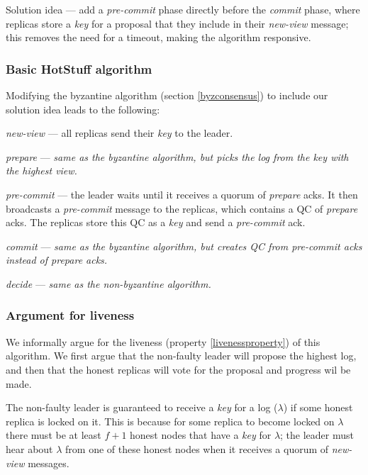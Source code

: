 Solution idea --- add a \textit{pre-commit} phase directly before the \textit{commit} phase, where replicas store a \textit{key} for a proposal that they include in their \textit{new-view} message; this removes the need for a timeout, making the algorithm responsive.

\subsubsection{Basic HotStuff algorithm}

Modifying the byzantine algorithm (section \ref{byzconsensus}) to include our solution idea leads to the following:

\begin{description}
	\item \textit{new-view} --- all replicas send their \textit{key} to the leader.
	\item \textit{prepare} ---  \textit{same as the byzantine algorithm, but picks the log from the key with the highest view.}
	\item \textit{pre-commit} --- the leader waits until it receives a quorum of \textit{prepare} acks. It then broadcasts a \textit{pre-commit} message to the replicas, which contains a QC of \textit{prepare} acks. The replicas store this QC as a \textit{key} and send a \textit{pre-commit} ack.
	\item \textit{commit} --- \textit{same as the byzantine algorithm, but creates QC from pre-commit acks instead of prepare acks.}
	\item \textit{decide} --- \textit{same as the non-byzantine algorithm.}
\end{description}

\subsubsection{Argument for liveness}
We informally argue for the liveness (property \ref{livenessproperty}) of this algorithm. We first argue that the non-faulty leader will propose the highest log, and then that the honest replicas will vote for the proposal and progress wil be made.

The non-faulty leader is guaranteed to receive a \textit{key} for a log ($\lambda$) if some honest replica is locked on it. This is because for some replica to become locked on $\lambda$ there must be at least $f + 1$ honest nodes that have a \textit{key} for $\lambda$; the leader must hear about $\lambda$ from one of these honest nodes when it receives a quorum of \textit{new-view} messages.

